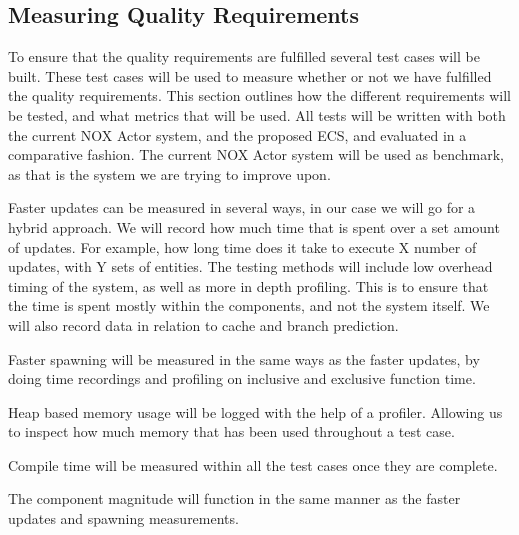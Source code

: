 \subsection*{Measuring Quality Requirements}
To ensure that the quality requirements are fulfilled several test cases will be built. 
These test cases will be used to measure whether or not we have fulfilled the quality requirements.
This section outlines how the different requirements will be tested, and what metrics that will be used.
All tests will be written with both the current NOX Actor system, and the proposed ECS, and evaluated in a comparative fashion.
The current NOX Actor system will be used as benchmark, as that is the system we are trying to improve upon.

Faster updates can be measured in several ways, in our case we will go for a hybrid approach. 
We will record how much time that is spent over a set amount of updates. 
For example, how long time does it take to execute X number of updates, with Y sets of entities.
The testing methods will include low overhead timing of the system, as well as more in depth profiling.
This is to ensure that the time is spent mostly within the components, and not the system itself.
We will also record data in relation to cache and branch prediction.

Faster spawning will be measured in the same ways as the faster updates, 
by doing time recordings and profiling on inclusive and exclusive function time.

Heap based memory usage will be logged with the help of a profiler. Allowing us to inspect how much memory that has been used throughout a test case.

Compile time will be measured within all the test cases once they are complete.

The component magnitude will function in the same manner as the faster updates and spawning measurements. 
